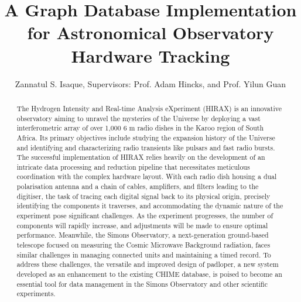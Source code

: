 \documentclass[apj]{emulateapj}
\begin{document}
\title{A Graph Database Implementation for Astronomical Observatory
Hardware Tracking}
 
\author{Zannatul S. Isaque, Supervisors: Prof. Adam Hincks, and Prof. Yilun Guan}


 
\begin{abstract}
The Hydrogen Intensity and Real-time Analysis eXperiment (HIRAX) is an innovative observatory aiming to unravel the mysteries of the Universe by deploying a vast interferometric array of over 1,000 6 m radio dishes in the Karoo region of South Africa. Its primary objectives include studying the expansion history of the Universe and identifying and characterizing radio transients like pulsars and fast radio bursts. The successful implementation of HIRAX relies heavily on the development of an intricate data processing and reduction pipeline that necessitates meticulous coordination with the complex hardware layout. With each radio dish housing a dual polarisation antenna and a chain of cables, amplifiers, and filters leading to the digitiser, the task of tracing each digital signal back to its physical origin, precisely identifying the components it traverses, and accommodating the dynamic nature of the experiment pose significant challenges. As the experiment progresses, the number of components will rapidly increase, and adjustments will be made to ensure optimal performance. Meanwhile, the Simons Observatory, a next-generation ground-based telescope focused on measuring the Cosmic Microwave Background radiation, faces similar challenges in managing connected units and maintaining a timed record. To address these challenges, the versatile and improved design of padloper, a new system developed as an enhancement to the existing CHIME database, is poised to become an essential tool for data management in the Simons Observatory and other scientific experiments.
\end{abstract}

\end{document}
